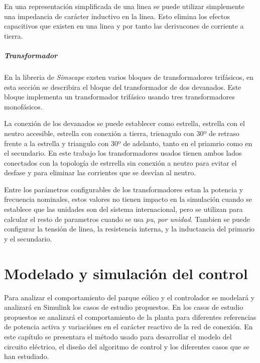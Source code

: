 \documentclass{book}
\begin{document}
En una representaci\'on simplificada de una linea se puede utilizar simplemente una impedancia de car\'acter inductivo en la linea. Esto elimina los efectos capacitivos que existen en una linea y por tanto las derivacones de corriente a tierra. \par 

		\paragraph{Transformador}

En la libreria de \emph{Simscape} exsten varios bloques de transformadores trif\'asicos, en esta secci\'on se describira el bloque del transformador de dos devanados. Este bloque implementa un transformador trif\'asico usando tres transformadores monof\'asicos. \par

La conexi\'on de los devanados se puede establecer como estrella, estrella con el neutro accesible, estrella con conexi\'on a tierra, trienagulo con 30º de retraso frente a la estrella y triangulo con 30º de adelanto,  tanto en el priamrio como en el secundario. En este trabajo los transformadores usados tienen ambos lados conectados con la topolog\'ia de estrrella sin conexi\'on a neutro para evitar el desfase y para eliminar las corrientes que se desv\'ian al neutro. \par

Entre los par\'ametros configurables de los transformadores estan la potencia y frecuencia nominales, estos valores no tienen impacto en la simulaci\'on cuando se establece que las unidades son del sistema internacional, pero se utilizan para calcular el resto de parametros cuando se usa \emph{pu}, \emph{por unidad}. Tambien se puede configurar la tensi\'on de linea, la resistencia interna, y la inductancia del primario y el secundario. \par


\chapter{Modelado y simulaci\'on del control}

Para analizar el comportamiento del parque e\'olico y el controlador se modelar\'a y analizar\'a en Simulink los casos de estudio propuestos. En los casos de estudio propuestos se analizar\'a el comportamiento de la planta para diferentes referencias de potencia activa y variaci\'ones en el car\'acter reactivo de la red de conexi\'on. En este cap\'itulo se presentara el m\'etodo usado para desarrollar el modelo del circuito el\'ectrico, el diseño del algoritmo de control y los diferentes casos que se han estudiado. \par
\end{document}
